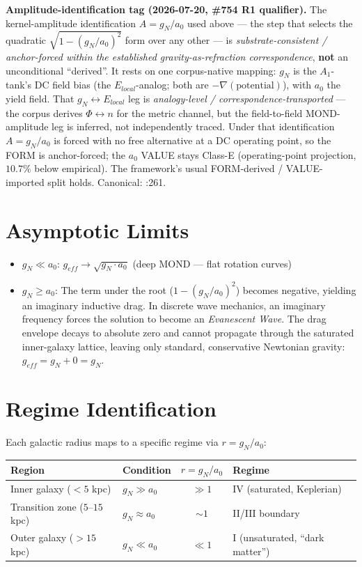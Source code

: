 \noindent\textbf{Amplitude-identification tag (2026-07-20, \#754 R1
qualifier).} The kernel-amplitude identification $A = g_N/a_0$ used above ---
the step that selects the quadratic $\sqrt{1 - (g_N/a_0)^2}$ form over any
other --- is \emph{substrate-consistent / anchor-forced within the
established gravity-as-refraction correspondence}, \textbf{not} an
unconditional ``derived''. It rests on one corpus-native mapping: $g_N$ is
the $A_1$-tank's DC field bias (the $E_{local}$-analog; both are
$-\nabla(\text{potential})$), with $a_0$ the yield field. That
$g_N \leftrightarrow E_{local}$ leg is \emph{analogy-level /
correspondence-transported} --- the corpus derives
$\Phi \leftrightarrow n$ for the metric channel, but the field-to-field
MOND-amplitude leg is inferred, not independently traced. Under that
identification $A = g_N/a_0$ is forced with no free alternative at a DC
operating point, so the FORM is anchor-forced; the $a_0$ VALUE stays
Class-E (operating-point projection, $10.7\%$ below empirical). The
framework's usual FORM-derived / VALUE-imported split holds. Canonical:
:261.

\section{Asymptotic Limits}

\begin{itemize}
    \item $g_N \ll a_0$: $g_{eff} \to \sqrt{g_N \cdot a_0}$
          \quad (deep MOND --- flat rotation curves)
    \item $g_N \ge a_0$: The term under the root ($1 - (g_N/a_0)^2$) becomes negative, yielding an imaginary inductive drag. In discrete wave mechanics, an imaginary frequency forces the solution to become an \textit{Evanescent Wave}. The drag envelope decays to absolute zero and cannot propagate through the saturated inner-galaxy lattice, leaving only standard, conservative Newtonian gravity:  $g_{eff} = g_N + 0 = g_N$.
\end{itemize}

\section{Regime Identification}
\label{sec:galactic_regimes}

Each galactic radius maps to a specific regime via $r = g_N/a_0$:

\begin{center}
\small
\begin{tabularx}{\textwidth}{@{}llcX@{}}
\toprule
\textbf{Region} & \textbf{Condition} & \textbf{$r = g_N/a_0$} & \textbf{Regime} \\
\midrule
Inner galaxy ($< 5$ kpc) & $g_N \gg a_0$ & $\gg 1$ & IV (saturated, Keplerian) \\
Transition zone ($5$--$15$ kpc) & $g_N \approx a_0$ & $\sim 1$ & II/III boundary \\
Outer galaxy ($> 15$ kpc) & $g_N \ll a_0$ & $\ll 1$ & I (unsaturated, ``dark matter'') \\
\bottomrule
\end{tabularx}
\end{center}

